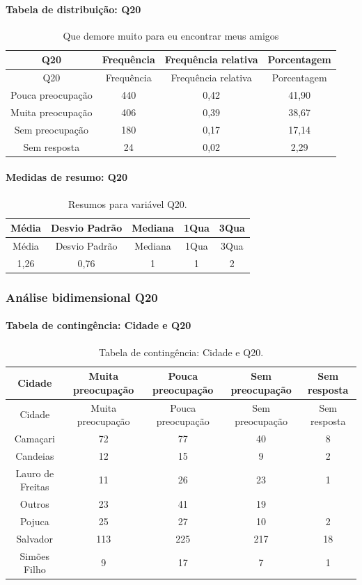 \documentclass[]{article}
\let\oldparagraph\paragraph
\renewcommand{\paragraph}[1]{\oldparagraph{#1}\mbox{}}
\begin{document}
\hypertarget{tabela-de-distribuiuxe7uxe3o-q20}{%
\paragraph{Tabela de distribuição: Q20}\label{tabela-de-distribuiuxe7uxe3o-q20}}

\begin{longtable}[]{@{}cccc@{}}
\caption{\label{tab:unnamed-chunk-365}Que demore muito para eu encontrar meus amigos}\tabularnewline
\toprule
Q20 & Frequência & Frequência relativa & Porcentagem\tabularnewline
\midrule
\endfirsthead
\toprule
Q20 & Frequência & Frequência relativa & Porcentagem\tabularnewline
\midrule
\endhead
Pouca preocupação & 440 & 0,42 & 41,90\tabularnewline
Muita preocupação & 406 & 0,39 & 38,67\tabularnewline
Sem preocupação & 180 & 0,17 & 17,14\tabularnewline
Sem resposta & 24 & 0,02 & 2,29\tabularnewline
\bottomrule
\end{longtable}

\hypertarget{medidas-de-resumo-q20}{%
\paragraph{Medidas de resumo: Q20}\label{medidas-de-resumo-q20}}

\begin{longtable}[]{@{}ccccc@{}}
\caption{\label{tab:unnamed-chunk-366}Resumos para variável Q20.}\tabularnewline
\toprule
Média & Desvio Padrão & Mediana & 1Qua & 3Qua\tabularnewline
\midrule
\endfirsthead
\toprule
Média & Desvio Padrão & Mediana & 1Qua & 3Qua\tabularnewline
\midrule
\endhead
1,26 & 0,76 & 1 & 1 & 2\tabularnewline
\bottomrule
\end{longtable}

\cleardoublepage

\hypertarget{anuxe1lise-bidimensional-q20}{%
\subsubsection{Análise bidimensional Q20}\label{anuxe1lise-bidimensional-q20}}

\hypertarget{tabela-de-continguxeancia-cidade-e-q20}{%
\paragraph{Tabela de contingência: Cidade e Q20}\label{tabela-de-continguxeancia-cidade-e-q20}}

\begin{longtable}[]{@{}ccccc@{}}
\caption{\label{tab:unnamed-chunk-367}Tabela de contingência: Cidade e Q20.}\tabularnewline
\toprule
Cidade & Muita preocupação & Pouca preocupação & Sem preocupação & Sem resposta\tabularnewline
\midrule
\endfirsthead
\toprule
Cidade & Muita preocupação & Pouca preocupação & Sem preocupação & Sem resposta\tabularnewline
\midrule
\endhead
Camaçari & 72 & 77 & 40 & 8\tabularnewline
Candeias & 12 & 15 & 9 & 2\tabularnewline
Lauro de Freitas & 11 & 26 & 23 & 1\tabularnewline
Outros & 23 & 41 & 19 &\tabularnewline
Pojuca & 25 & 27 & 10 & 2\tabularnewline
Salvador & 113 & 225 & 217 & 18\tabularnewline
Simões Filho & 9 & 17 & 7 & 1\tabularnewline
\bottomrule
\end{longtable}
\end{document}
